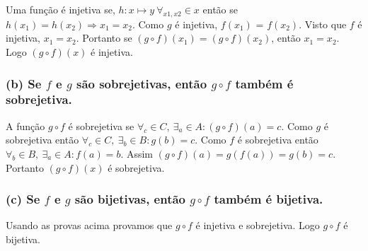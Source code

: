 \documentclass{article}
\begin{document}
Uma função é injetiva se, $h:x \longmapsto y \ \forall_{x1, x2} \in x$ então se $h(x_1)=h(x_2) \Rightarrow x_1 =x_2$. Como $g$ é injetiva, $f(x_1)$ = $f(x_2)$. Visto que $f$ é injetiva,
$x_1=x_2$. Portanto se $(g \circ f)(x_1) = (g \circ f)(x_2)$, então $x_1=x_2$. Logo $(g \circ f)(x)$ é injetiva.

\subsubsection*{(b) Se $f$ e $g$ são sobrejetivas, então $g \circ f$ também é sobrejetiva.}
A função $g \circ f$ é sobrejetiva se $\forall_c \in C, \ \exists_a \in A:(g \circ f)(a) = c$. Como $g$ é sobrejetiva então $\forall_c \in C, \ \exists_b \in B:g(b) = c$. Como $f$ é sobrejetiva então $\forall_b \in B, \ \exists_a \in A:f(a) = b$. Assim $(g \circ f)(a) = g(f(a)) = g(b) = c.$ Portanto $
  (g \circ f)(x)$ é sobrejetiva.

\subsubsection*{(c) Se $f$ e $g$ são bijetivas, então $g \circ f$ também é bijetiva.}

Usando as provas acima provamos que $g \circ f$ é injetiva e sobrejetiva. Logo $g \circ f$ é bijetiva.
\end{document}
